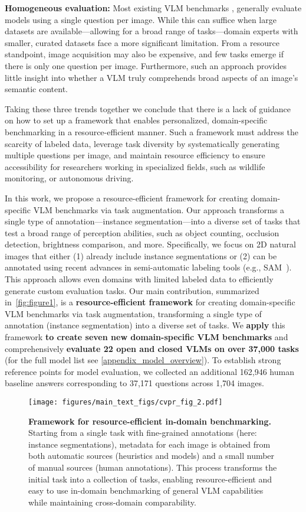 \textbf{Homogeneous evaluation:} Most existing VLM benchmarks \cite{fu2024blink, yue2023mmmu, wang2024journeybench, zhang2024mmereal}, generally evaluate models using a single question per image. While this can suffice when large datasets are available—allowing for a broad range of tasks—domain experts with smaller, curated datasets face a more significant limitation. From a resource standpoint, image acquisition may also be expensive, and few tasks emerge if there is only one question per image. Furthermore, such an approach provides little insight into whether a VLM truly comprehends broad aspects of an image’s semantic content.

Taking these three trends together we conclude that there is a lack of guidance on how to set up a framework that enables personalized, domain-specific benchmarking in a resource-efficient manner.
Such a framework must address the scarcity of labeled data, leverage task diversity by systematically generating multiple questions per image, and maintain resource efficiency to ensure accessibility for researchers working in specialized fields, such as wildlife monitoring, or autonomous driving. 

In this work, we propose a resource-efficient framework for creating domain-specific VLM benchmarks via task augmentation. Our approach transforms a single type of annotation—instance segmentation—into a diverse set of tasks that test a broad range of perception abilities, such as object counting, occlusion detection, brightness comparison, and more.
Specifically, we focus on 2D natural images that either (1) already include instance segmentations or (2) can be annotated using recent advances in semi-automatic labeling tools (e.g., SAM~\cite{ravi2024sam}). This approach allows even domains with limited labeled data to efficiently generate custom evaluation tasks. Our main contribution, summarized in~\cref{fig:figure1}, is a \textbf{resource-efficient framework} for creating domain-specific VLM benchmarks via task augmentation, transforming a single type of annotation (instance segmentation) into a diverse set of tasks. We \textbf{apply} this framework \textbf{to create seven new domain-specific VLM benchmarks} and comprehensively \textbf{evaluate 22 open and closed VLMs on over 37,000 tasks }(for the full model list see \cref{appendix_model_overview}). To establish strong reference points for model evaluation, we collected an additional 162,946 human baseline answers corresponding to 37,171 questions across 1,704 images.

\begin{figure*}[ht]
    \centering
    \texttt{[image: figures/main\_text\_figs/cvpr\_fig\_2.pdf]}
    \caption{\textbf{Framework for resource-efficient in-domain benchmarking.} Starting from a single task with fine-grained annotations (here: instance segmentations), metadata for each image is obtained from both automatic sources (heuristics and models) and a small number of manual sources (human annotations). This process transforms the initial task into a collection of tasks, enabling resource-efficient and easy to use in-domain benchmarking of general VLM capabilities while maintaining cross-domain comparability.}
    \label{fig:metadataaug}
\end{figure*}
